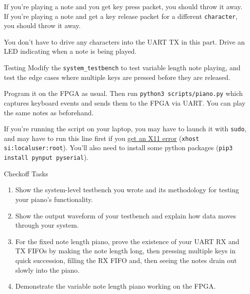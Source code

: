\documentclass[11pt]{article}
\makeatletter
\renewcommand{\section}
{\@startsection {section}{1}{0pt}
 {-2ex}
 {1ex}
 {\bfseries\Large}}
\renewcommand{\subsection}
{\@startsection {subsection}{1}{0pt}
 {-1ex}
 {0.5ex}
 {\bfseries\normalsize}}
\makeatother
\begin{document}
If you're playing a note and you get key press packet, you should throw it away.
If you're playing a note and get a key release packet for a different \texttt{character}, you should throw it away.

You don't have to drive any characters into the UART TX in this part.
Drive an LED indicating when a note is being played.

\subsection{Testing}
Modify the \verb|system_testbench| to test variable length note playing, and test the edge cases where multiple keys are pressed before they are released.

Program it on the FPGA as usual.
Then run \verb|python3 scripts/piano.py| which captures keyboard events and sends them to the FPGA via UART.
You can play the same notes as beforehand.

If you're running the script on your laptop, you may have to launch it with \verb|sudo|, and may have to run this line first if you \href{https://stackoverflow.com/questions/48833451/no-protocol-specified-when-running-a-sudo-su-app-on-ubuntu-linux}{get an X11 error} (\verb|xhost si:localuser:root|).
You'll also need to install some python packages (\verb|pip3 install pynput pyserial|).


\section{Checkoff Tasks}
\begin{enumerate}
  \item Show the system-level testbench you wrote and its methodology for testing your piano's functionality.
  \item Show the output waveform of your testbench and explain how data moves through your system.
  \item For the fixed note length piano, prove the existence of your UART RX and TX FIFOs by making the note length long, then pressing multiple keys in quick succession, filling the RX FIFO and, then seeing the notes drain out slowly into the piano.
  \item Demonstrate the variable note length piano working on the FPGA.
\end{enumerate}
\end{document}
